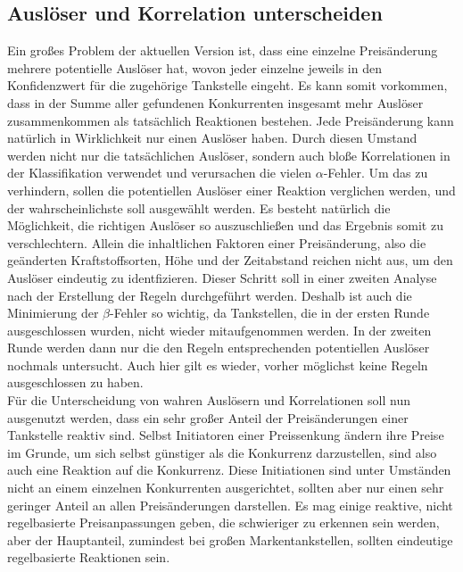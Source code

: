 
\subsection{Auslöser und Korrelation unterscheiden}
Ein großes Problem der aktuellen Version ist, dass eine einzelne Preisänderung mehrere potentielle Auslöser hat, wovon jeder einzelne jeweils in den Konfidenzwert für die zugehörige Tankstelle eingeht. Es kann somit vorkommen, dass in der Summe aller gefundenen Konkurrenten insgesamt mehr Auslöser zusammenkommen als tatsächlich Reaktionen bestehen. Jede Preisänderung kann natürlich in Wirklichkeit nur einen Auslöser haben. Durch diesen Umstand werden nicht nur die tatsächlichen Auslöser, sondern auch bloße Korrelationen in der Klassifikation verwendet und verursachen die vielen $\alpha$-Fehler. Um das zu verhindern, sollen die potentiellen Auslöser einer Reaktion verglichen werden, und der wahrscheinlichste soll ausgewählt werden. Es besteht natürlich die Möglichkeit, die richtigen Auslöser so auszuschließen und das Ergebnis somit zu verschlechtern. Allein die inhaltlichen Faktoren einer Preisänderung, also die geänderten Kraftstoffsorten, Höhe und der Zeitabstand reichen nicht aus, um den Auslöser eindeutig zu identfizieren. Dieser Schritt soll in einer zweiten Analyse nach der Erstellung der Regeln durchgeführt werden. Deshalb ist auch die Minimierung der $\beta$-Fehler so wichtig, da Tankstellen, die in der ersten Runde ausgeschlossen wurden, nicht wieder mitaufgenommen werden. In der zweiten Runde werden dann nur die den Regeln entsprechenden potentiellen Auslöser nochmals untersucht. Auch hier gilt es wieder, vorher möglichst keine Regeln ausgeschlossen zu haben.\\
Für die Unterscheidung von wahren Auslösern und Korrelationen soll nun ausgenutzt werden, dass ein sehr großer Anteil der Preisänderungen einer Tankstelle reaktiv sind. Selbst Initiatoren einer Preissenkung ändern ihre Preise im Grunde, um sich selbst günstiger als die Konkurrenz darzustellen, sind also auch eine Reaktion auf die Konkurrenz. Diese Initiationen sind unter Umständen nicht an einem einzelnen Konkurrenten ausgerichtet, sollten aber nur einen sehr geringer Anteil an allen Preisänderungen darstellen. Es mag einige reaktive, nicht regelbasierte Preisanpassungen geben, die schwieriger zu erkennen sein werden, aber der Hauptanteil, zumindest bei großen Markentankstellen, sollten eindeutige regelbasierte Reaktionen sein.\\
